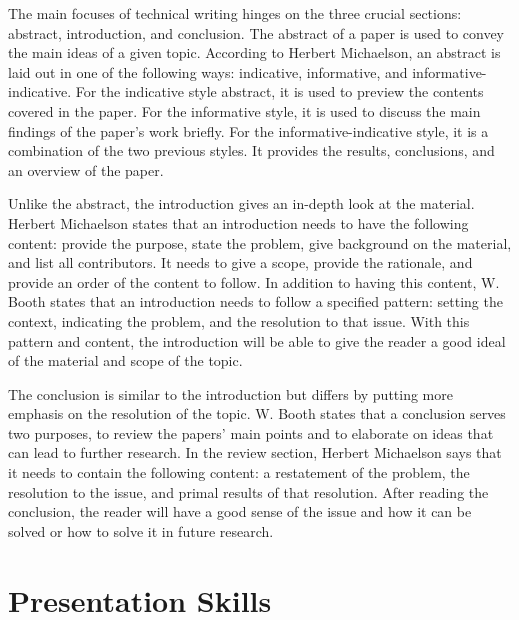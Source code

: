 \documentclass[12pt]{article}
\begin{document}
The main focuses of technical writing hinges on the three crucial sections: abstract, introduction, and conclusion. The abstract of a paper is used to convey the main ideas of a given topic. According to Herbert Michaelson, an abstract is laid out in one of the following ways: indicative, informative, and informative-indicative\cite{RefWorks:Michaelson}. For the indicative style abstract, it is used to preview the contents covered in the paper\cite{RefWorks:Michaelson}. For the informative style, it is used to discuss the main findings of the paper's work briefly\cite{RefWorks:Michaelson}. For the informative-indicative style, it is a combination of the two previous styles. It provides the results, conclusions, and an overview of the paper\cite{RefWorks:Michaelson}. 

Unlike the abstract, the introduction gives an in-depth look at the material. Herbert Michaelson states that an introduction needs to have the following content: provide the purpose, state the problem, give background on the material, and list all contributors\cite{RefWorks:Michaelson}. It needs to give a scope, provide the rationale, and provide an order of the content to follow\cite{RefWorks:Michaelson}. In addition to having this content, W. Booth states that an introduction needs to follow a specified pattern: setting the context, indicating the problem, and the resolution to that issue\cite{Booth}. With this pattern and content, the introduction will be able to give the reader a good ideal of the material and scope of the topic.   

The conclusion is similar to the introduction but differs by putting more emphasis on the resolution of the topic. W. Booth states that a conclusion serves two purposes, to review the papers' main points and to elaborate on ideas that can lead to further research\cite{Booth}. In the review section, Herbert Michaelson says that it needs to contain the following content: a restatement of the problem, the resolution to the issue, and primal results of that resolution\cite{RefWorks:Michaelson}. After reading the conclusion, the reader will have a good sense of the issue and how it can be solved or how to solve it in future research. 


\section{Presentation Skills}
\end{document}

